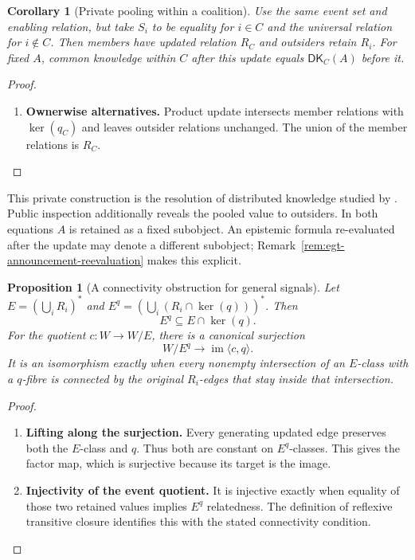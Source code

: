 \documentclass[11pt,a4paper]{article}
\numberwithin{equation}{section}
\newtheorem{proposition}[theorem]{Proposition}
\newtheorem{corollary}[theorem]{Corollary}
\theoremstyle{definition}
\theoremstyle{remark}
\theoremstyle{plain}
\begin{document}
\begin{corollary}[Private pooling within a coalition]
\label{cor:egt-private-pooling}
Use the same event set and enabling relation, but take $S_i$ to be
equality for $i\in C$ and the universal relation for $i\notin C$.
Then members have updated relation $R_C$ and outsiders retain $R_i$.
For fixed $A$, common knowledge within $C$ after this update equals
$\mathsf{DK}_C(A)$ before it.
\end{corollary}
\begin{proof}
\leavevmode
\begin{enumerate}[label=\textup{(\arabic*)},leftmargin=*,itemsep=4pt,topsep=3pt]
  \item \textbf{Ownerwise alternatives.} Product update intersects member relations with $\ker(q_C)$ and leaves
outsider relations unchanged. The union of the member relations is $R_C$.
\end{enumerate}
\end{proof}

This private construction is the resolution of distributed knowledge studied
by \citet{AgotnesWang2016ResolvingDistributedKnowledge}.
Public inspection additionally
reveals the pooled value to outsiders. In both equations $A$ is retained as a
fixed subobject. An epistemic formula re-evaluated after the update may
denote a different subobject; Remark~\ref{rem:egt-announcement-reevaluation} makes this explicit.

\begin{proposition}[A connectivity obstruction for general signals]
\label{prop:egt-inspection-connectivity}
Let $E=(\bigcup_iR_i)^*$ and
$E^q=(\bigcup_i(R_i\cap\ker(q)))^*$. Then
\[
 E^q\subseteq E\cap\ker(q).
\]
For the quotient $c:W\to W/E$, there is a canonical surjection
\[
 W/E^q\longrightarrow\operatorname{im}\langle c,q\rangle.
\]
It is an isomorphism exactly when every nonempty intersection of an
$E$-class with a $q$-fibre is connected by the original $R_i$-edges
that stay inside that intersection.
\end{proposition}
\begin{proof}
\leavevmode
\begin{enumerate}[label=\textup{(\arabic*)},leftmargin=*,itemsep=4pt,topsep=3pt]
  \item \textbf{Lifting along the surjection.} Every generating updated edge preserves both the $E$-class and $q$. Thus both are constant on $E^q$-classes. This gives the factor map,
which is surjective because its target is the image.
  \item \textbf{Injectivity of the event quotient.} It is injective
exactly when equality of those two retained values implies $E^q$
relatedness. The definition of reflexive transitive closure identifies
this with the stated connectivity condition.
\end{enumerate}
\end{proof}
\end{document}
